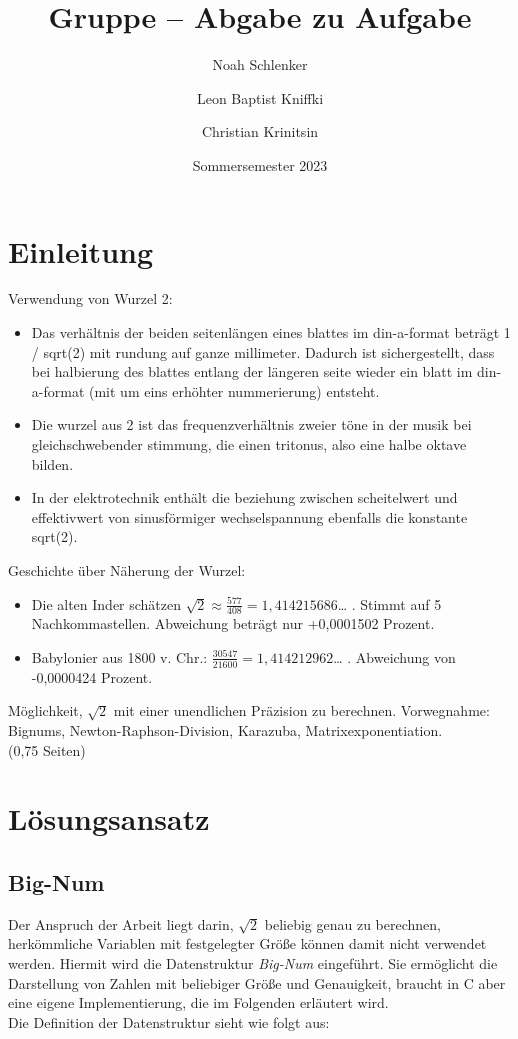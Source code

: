 \documentclass[course=erap]{aspdoc}
\author{Noah Schlenker \and Leon Baptist Kniffki \and Christian Krinitsin}
\date{Sommersemester 2023} %
\title{Gruppe \theGroup{} -- Abgabe zu Aufgabe \theNumber}
\begin{document}
\maketitle

\section{Einleitung} \label{sec:einleitung}

Verwendung von Wurzel 2:
\begin{itemize}
  \item Das verhältnis der beiden seitenlängen eines blattes im din-a-format beträgt 1 / sqrt(2) mit rundung auf 
        ganze millimeter. Dadurch ist sichergestellt, dass bei halbierung des blattes entlang der längeren seite wieder 
        ein blatt im din-a-format (mit um eins erhöhter nummerierung) entsteht.
  \item Die wurzel aus 2 ist das frequenzverhältnis zweier töne in der musik bei gleichschwebender stimmung, die einen tritonus, 
        also eine halbe oktave bilden.
  \item In der elektrotechnik enthält die beziehung zwischen scheitelwert und effektivwert von sinusförmiger wechselspannung ebenfalls die konstante 
        sqrt(2).
\end{itemize}

Geschichte über Näherung der Wurzel:
\begin{itemize}
  \item Die alten Inder schätzen $\sqrt{2} \approx \tfrac {577}{408} = 1,414215686$… . Stimmt auf 5 Nachkommastellen. Abweichung beträgt nur +0,0001502 Prozent.
  \item Babylonier aus 1800 v. Chr.: $\tfrac {30547}{21600} = 1,414212962$… . Abweichung von -0,0000424 Prozent.
\end{itemize}

Möglichkeit, $\sqrt{2}$ mit einer unendlichen Präzision zu berechnen. Vorwegnahme: Bignums, Newton-Raphson-Division, Karazuba, Matrixexponentiation. \\
(0,75 Seiten)

\section{Lösungsansatz} \label{sec:loesungsansatz}
\subsection{Big-Num} \label{sec:bignum}
Der Anspruch der Arbeit liegt darin, $\sqrt{2}$ beliebig genau zu berechnen, herkömmliche Variablen mit festgelegter Größe können damit nicht verwendet werden. Hiermit wird die Datenstruktur \textit{Big-Num} eingeführt.
Sie ermöglicht die Darstellung von Zahlen mit beliebiger Größe und Genauigkeit, braucht in C aber eine eigene Implementierung, die im Folgenden erläutert wird. \\
Die Definition der Datenstruktur sieht wie folgt aus:
\end{document}
